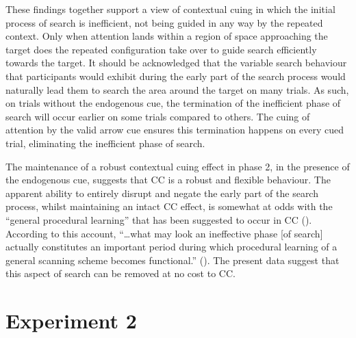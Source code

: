 \documentclass[
  man,
  floatsintext,
  longtable,
  nolmodern,
  notxfonts,
  notimes,
  colorlinks=true,linkcolor=blue,citecolor=blue,urlcolor=blue]{apa7}
\begin{document}
These findings together support a view of contextual cuing in which the
initial process of search is inefficient, not being guided in any way by
the repeated context. Only when attention lands within a region of space
approaching the target does the repeated configuration take over to
guide search efficiently towards the target. It should be acknowledged
that the variable search behaviour that participants would exhibit
during the early part of the search process would naturally lead them to
search the area around the target on many trials. As such, on trials
without the endogenous cue, the termination of the inefficient phase of
search will occur earlier on some trials compared to others. The cuing
of attention by the valid arrow cue ensures this termination happens on
every cued trial, eliminating the inefficient phase of search.

The maintenance of a robust contextual cuing effect in phase 2, in the
presence of the endogenous cue, suggests that CC is a robust and
flexible behaviour. The apparent ability to entirely disrupt and negate
the early part of the search process, whilst maintaining an intact CC
effect, is somewhat at odds with the ``general procedural learning''
that has been suggested to occur in CC (). According to this account, ``\ldots what may look an
ineffective phase {[}of search{]} actually constitutes an important
period during which procedural learning of a general scanning scheme
becomes functional.'' (). The present data suggest that this aspect of search can be removed
at no cost to CC.

\section{Experiment 2}\label{experiment-2}
\end{document}
